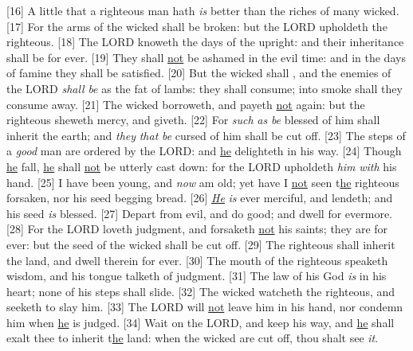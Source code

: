 [16] \textcolor[cmyk]{0.99998,1,0,0}{A little that a righteous man hath \emph{is} better than the riches of many wicked.}
[17] \textcolor[cmyk]{0.99998,1,0,0}{For the arms of the wicked shall be broken: but the LORD upholdeth the righteous.}
[18] \textcolor[cmyk]{0.99998,1,0,0}{The LORD knoweth the days of the upright: and their inheritance shall be for ever.}
[19] \textcolor[cmyk]{0.99998,1,0,0}{They shall \underline{not} be ashamed in the evil time: and in the days of famine they shall be satisfied.}
[20] \textcolor[cmyk]{0.99998,1,0,0}{But the wicked shall , and the enemies of the LORD \emph{shall} \emph{be} as the fat of lambs: they shall consume; into smoke shall they consume away.}
[21] \textcolor[cmyk]{0.99998,1,0,0}{The wicked borroweth, and payeth \underline{not} again: but the righteous sheweth mercy, and giveth.}
[22] \textcolor[cmyk]{0.99998,1,0,0}{For \emph{such} \emph{as} \emph{be} blessed of him shall inherit the earth; and \emph{they} \emph{that} \emph{be} cursed of him shall be cut off.}
[23] \textcolor[cmyk]{0.99998,1,0,0}{The steps of a \emph{good} man are ordered by the LORD: and \underline{he} delighteth in his way.}
[24] \textcolor[cmyk]{0.99998,1,0,0}{Though \underline{he} fall, \underline{he} shall \underline{not} be utterly cast down: for the LORD upholdeth \emph{him} \emph{with} his hand.}
[25] \textcolor[cmyk]{0.99998,1,0,0}{I have been young, and \emph{now} am old; yet have I \underline{not} seen t\underline{he} righteous forsaken, nor his seed begging bread.}
[26] \textcolor[cmyk]{0.99998,1,0,0}{\emph{\underline{He}} \emph{is} ever merciful, and lendeth; and his seed \emph{is} blessed.}
[27] \textcolor[cmyk]{0.99998,1,0,0}{Depart from evil, and do good; and dwell for evermore.}
[28] \textcolor[cmyk]{0.99998,1,0,0}{For the LORD loveth judgment, and forsaketh \underline{not} his saints; they are  for ever: but the seed of the wicked shall be cut off.}
[29] \textcolor[cmyk]{0.99998,1,0,0}{The righteous shall inherit the land, and dwell therein for ever.}
[30] \textcolor[cmyk]{0.99998,1,0,0}{The mouth of the righteous speaketh wisdom, and his tongue talketh of judgment.}
[31] \textcolor[cmyk]{0.99998,1,0,0}{The law of his God \emph{is} in his heart; none of his steps shall slide.}
[32] \textcolor[cmyk]{0.99998,1,0,0}{The wicked watcheth the righteous, and seeketh to slay him.}
[33] \textcolor[cmyk]{0.99998,1,0,0}{The LORD will \underline{not} leave him in his hand, nor condemn him when \underline{he} is judged.}
[34] \textcolor[cmyk]{0.99998,1,0,0}{Wait on the LORD, and keep his way, and \underline{he} shall exalt thee to inherit t\underline{he} land: when the wicked are cut off, thou shalt see \emph{it}.}
